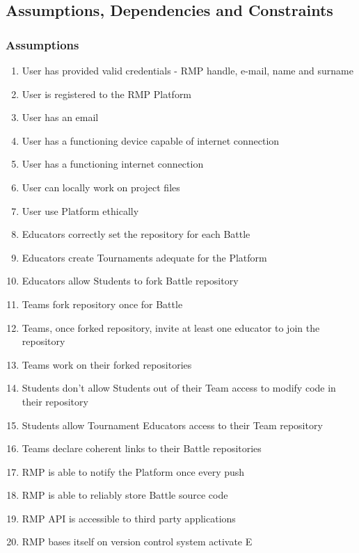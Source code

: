 \subsection{Assumptions, Dependencies and Constraints}
\subsubsection{Assumptions}
\begin{enumerate}[label=$\bullet$ \textbf{D\arabic*:}]
    \item User has provided valid credentials - RMP handle, e-mail, name and surname
    \item User is registered to the RMP Platform
    \item User has an email
    \item User has a functioning device capable of internet connection
    \item User has a functioning internet connection
    \item User can locally work on project files
    \item User use Platform ethically
    \item Educators correctly set the repository for each Battle
    \item Educators create Tournaments adequate for the Platform
    \item Educators allow Students to fork Battle repository
    \item Teams fork repository once for Battle
    \item Teams, once forked repository, invite at least one educator to join the repository
    \item Teams work on their forked repositories
    \item Students don't allow Students out of their Team access to modify code in their repository
    \item Students allow Tournament Educators access to their Team repository
    \item Teams declare coherent links to their Battle repositories
    \item RMP is able to notify the Platform once every push
    \item RMP is able to reliably store Battle source code
    \item RMP API is accessible to third party applications
    \item RMP bases itself on version control system
    activate E\end{enumerate}
